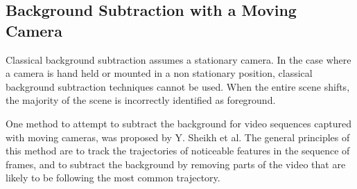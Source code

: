 \subsection{Background Subtraction with a Moving Camera}

Classical background subtraction assumes a stationary camera. In the case where a camera is hand held or mounted in a non stationary position, classical background subtraction techniques cannot be used. When the entire scene shifts, the majority of the scene is incorrectly identified as foreground.

One method to attempt to subtract the background for video sequences captured with moving cameras, was proposed by Y. Sheikh et al\cite{bgsubmove}. The general principles of this method are to track the trajectories of noticeable features in the sequence of frames, and to subtract the background by removing parts of the video that are likely to be following the most common trajectory.